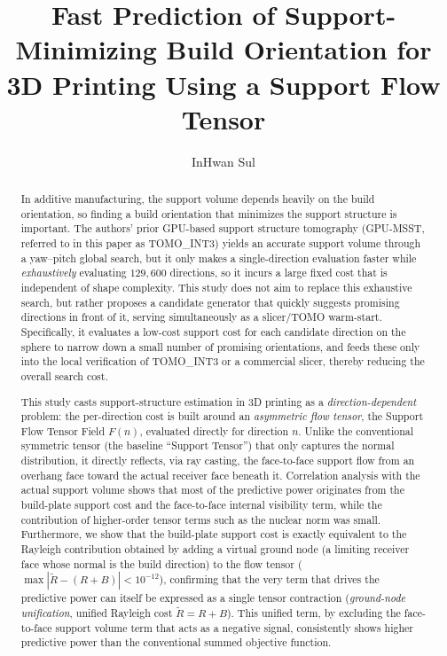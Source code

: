 \documentclass[11pt,a4paper]{article}
\title{Fast Prediction of Support-Minimizing Build Orientation for 3D Printing Using a Support Flow Tensor}
\author{InHwan Sul}
\date{}
\begin{document}
\maketitle

\begin{abstract}
In additive manufacturing, the support volume depends heavily on the build orientation, so finding a build orientation that minimizes the support structure is important.
The authors' prior GPU-based support structure tomography (GPU-MSST, referred to in this paper as TOMO\_INT3)
yields an accurate support volume through a yaw--pitch global search, but it only makes a single-direction evaluation faster while
\emph{exhaustively} evaluating $129{,}600$ directions, so it incurs a large fixed cost that is independent of shape complexity.
This study does not aim to replace this exhaustive search, but rather proposes a candidate generator that quickly suggests promising directions in front of it,
serving simultaneously as a slicer/TOMO warm-start.
Specifically, it evaluates a low-cost support cost for each candidate direction on the sphere to narrow down a small number of promising orientations,
and feeds these only into the local verification of TOMO\_INT3 or a commercial slicer, thereby reducing the overall search cost.

This study casts support-structure estimation in 3D printing as a \emph{direction-dependent} problem: the per-direction cost
is built around an \emph{asymmetric flow tensor}, the Support Flow Tensor Field $F(n)$, evaluated directly for direction $n$.
Unlike the conventional symmetric tensor (the baseline ``Support Tensor'') that only captures the normal distribution,
it directly reflects, via ray casting, the face-to-face support flow from an overhang face toward the actual receiver face beneath it.
Correlation analysis with the actual support volume shows that most of the predictive power originates from the build-plate support cost and the face-to-face internal visibility term,
while the contribution of higher-order tensor terms such as the nuclear norm was small.
Furthermore, we show that the build-plate support cost is exactly equivalent to the Rayleigh contribution obtained by adding a virtual ground node
(a limiting receiver face whose normal is the build direction) to the flow tensor ($\max|\tilde R-(R+B)|<10^{-12}$),
confirming that the very term that drives the predictive power can itself be expressed as a single tensor contraction
(\emph{ground-node unification}, unified Rayleigh cost $\tilde R=R+B$).
This unified term, by excluding the face-to-face support volume term that acts as a negative signal, consistently shows higher predictive power than the conventional summed objective function.


\end{abstract}
\end{document}
